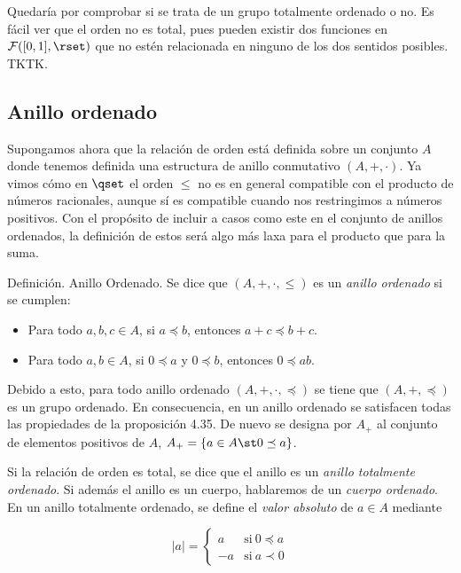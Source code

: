 Quedaría por comprobar si se trata de un grupo totalmente ordenado o no. Es
fácil ver que el orden no es total, pues pueden existir dos funciones en
$\mathcal{F}([0, 1], \rset)$ que no estén relacionada en ninguno de los dos
sentidos posibles. TKTK.





\subsection{Anillo ordenado}

Supongamos ahora que la relación de orden está definida sobre un conjunto
$A$ donde tenemos definida una estructura de anillo conmutativo $(A, +,
\cdot)$. Ya vimos cómo en $\qset$ el orden $\leq$ no es en general
compatible con el producto de números racionales, aunque sí es compatible
cuando nos restringimos a números positivos. Con el propósito de incluir a
casos como este en el conjunto de anillos ordenados, la definición de estos
será algo más laxa para el producto que para la suma.

Definición. Anillo Ordenado. Se dice que $(A, +, \cdot, \leq)$ es un
\emph{anillo ordenado} si se cumplen:

\begin{itemize}
  \item Para todo $a,b,c \in A$, si $a \preceq b$, entonces $a + c \preceq b
    + c$.
  \item Para todo $a,b \in A$, si $0 \preceq a$ y $0 \preceq b$, entonces $0
    \preceq ab$.
\end{itemize}

Debido a esto, para todo anillo ordenado $(A, +, \cdot, \preceq)$ se tiene
que $(A, +, \preceq)$ es un grupo ordenado. En consecuencia, en un anillo
ordenado se satisfacen todas las propiedades de la proposición 4.35. De
nuevo se designa por $A_+$ al conjunto de elementos positivos de $A$, $A_+ =
\{a \in A \st 0 \preceq a\}$.

Si la relación de orden es total, se dice que el anillo es un \emph{anillo
totalmente ordenado}. Si además el anillo es un cuerpo, hablaremos de un
\emph{cuerpo ordenado}. En un anillo totalmente ordenado, se define el
\emph{valor absoluto} de $a \in A$ mediante

$$
  |a| =
  \begin{cases}
    a & \text{si} \ 0 \preceq a \\
    {-a} & \text{si} \ a \prec 0
  \end{cases}
$$

